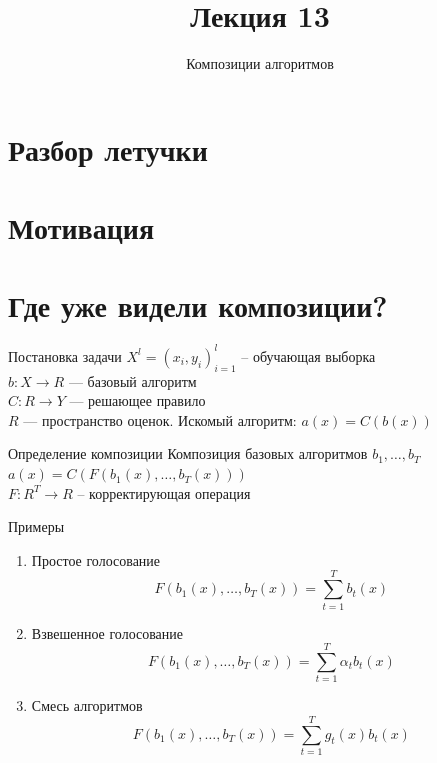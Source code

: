 \documentclass[10pt]{beamer}
\title{Лекция 13}
\subtitle{Композиции алгоритмов}
\begin{document}
\section{Разбор летучки}

\maketitle

\section{Мотивация}

\section{Где уже видели композиции?}

\begin{frame}{Постановка задачи}
  ${X^l = (x_i, y_i)_{i = 1}^l}$ -- обучающая выборка\\
  $b:X \rightarrow R$ --- базовый алгоритм\\
  $C:R \rightarrow Y$ --- решающее правило\\
  $R$ --- пространство оценок.
  \bigbreak
  Искомый алгоритм: $a(x) = C(b(x))$\\
\end{frame}

\begin{frame}{Определение композиции}
  Композиция базовых алгоритмов $b_1, \dots, b_T$\\
  \bigbreak
  $a(x) = C(F(b_1(x), \dots, b_T(x)))$\\
  $F: R^T \rightarrow R$ -- корректирующая операция
\end{frame}

\begin{frame}{Примеры}
  \begin{enumerate}
    \item Простое голосование\\
      $$F(b_1(x), \dots, b_T(x)) = \sum\limits_{t=1}^{T} b_t(x)$$
    \item Взвешенное голосование\\
      $$F(b_1(x), \dots, b_T(x)) = \sum\limits_{t=1}^{T} \alpha_t b_t(x)$$
    \item Смесь алгоритмов\\
      $$F(b_1(x), \dots, b_T(x)) = \sum\limits_{t=1}^{T} g_t(x) b_t(x)$$      
  \end{enumerate}
\end{frame}
\end{document}
